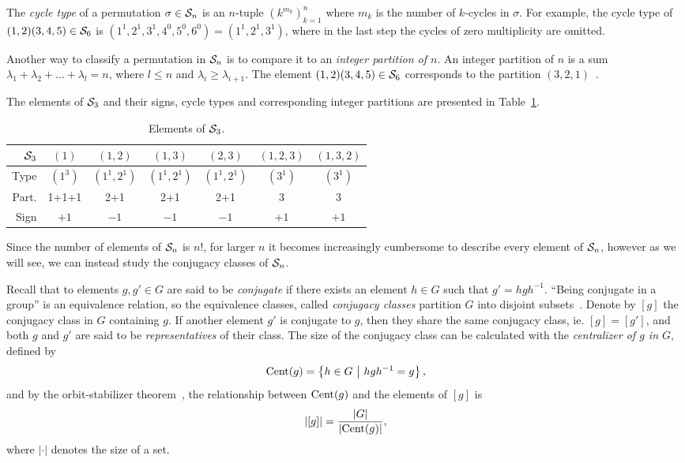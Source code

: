 The \textit{cycle type} of a permutation $\sigma \in \mathcal{S}_n$ is an $n$-tuple $(k^{m_k})_{k=1}^n$ where $m_k$ is the number of $k$-cycles in $\sigma$. For example, the cycle type of $(1,2)(3,4,5) \in \mathcal{S}_6$ is $(1^1, 2^1, 3^1, 4^0, 5^0, 6^0) = (1^1, 2^1, 3^1)$, where in the last step the cycles of zero multiplicity are omitted.

Another way to classify a permutation in $\mathcal{S}_n$ is to compare it to an \textit{integer partition of $n$}. An integer partition of $n$ is a sum $\lambda_1+ \lambda_2+ \dots+ \lambda_l = n$, where $l \leq n$ and $\lambda_i \geq \lambda_{i+1}$. The element $(1,2)(3,4,5) \in \mathcal{S}_6$ corresponds to the partition $(3,2,1)$~\cite[??]{Sagan}.  

\begin{example}[$\Sym_3$]
	The elements of $\Sym_3$ and their signs,  cycle types and corresponding integer partitions are presented in Table~\ref{table:elementsSym3}.
\end{example}

\begin{table}[hbt!]
	\centering
	\begin{tabular}{r | c c c c c c }
		$\Sym_3$ & $(1)$   & $(1,2)$     & $(1,3)$     & $(2,3)$     & $(1,2,3)$ & $(1,3,2)$ \\ \hline
		    Type & $(1^3)$ & $(1^1,2^1)$ & $(1^1,2^1)$ & $(1^1,2^1)$ & $(3^1)$   & $(3^1)$   \\
		   Part. & 1+1+1   & 2+1         & 2+1         & 2+1         & 3         & 3         \\
		   Sign  & $+1$    & $-1$        & $-1$        & $-1$        & $+1$      & $+1$
	\end{tabular}
	\caption{Elements of $\Sym_3$.}
	\label{table:elementsSym3}
\end{table}

Since the number of elements of $\mathcal{S}_n$ is $n!$, for larger $n$ it becomes increasingly cumbersome to describe every element of $\mathcal{S}_n$, however as we will see, we can instead study the conjugacy classes of $\mathcal{S}_n$.

Recall that to elements $g, g' \in G$ are said to be \textit{conjugate} if there exists an element $h \in G$ such that $g' = hgh^{-1}$. ``Being conjugate in a group'' is an equivalence relation, so the equivalence classes, called \textit{conjugacy classes} partition $G$ into disjoint subsets~\cite[??]{Biggs}. Denote by $[g]$ the conjugacy class in $G$ containing $g$. If another element $g'$ is conjugate to $g$, then they share the same conjugacy class, ie. $[g] = [g']$, and both $g$ and $g'$ are said to be \textit{representatives} of their class. The size of the conjugacy class can be calculated with the \textit{centralizer of $g$ in $G$}, defined by
\begin{align*}
	\text{Cent}(g) = \left\lbrace h \in G \ \middle\vert \ hgh^{-1} = g \right\rbrace,
\end{align*}
and by the orbit-stabilizer theorem~\cite[Thm.21.3]{Biggs}, the relationship between $\text{Cent}(g)$ and the elements of $[g]$ is 
\begin{align*}
	|[g]| = \frac{|G|}{|\text{Cent}(g)|},
\end{align*}
where $| \cdot |$ denotes the size of a set.

